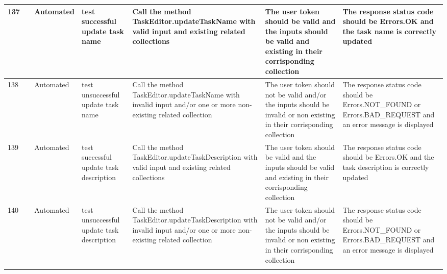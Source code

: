 \documentclass{article}
\begin{document}
{\begin{tabular}{|
    >{\columncolor[HTML]{FFFFFF}}l |
    >{\columncolor[HTML]{FFFFFF}}c |
    >{\columncolor[HTML]{FFFFFF}}l |l|l|l|l|}
    137                                 & \cellcolor[HTML]{FFFFFF}                                    & {\color[HTML]{11734B} Automated} & test successful update task name                    & Call the method TaskEditor.updateTaskName with valid input and existing related collections                                & The user token should be valid and the inputs should be valid and existing in their corrisponding collection                                             & The response status code should be Errors.OK and the task name is correctly updated                           \\ \cline{1-1} \cline{3-7} 
    138                                 & \cellcolor[HTML]{FFFFFF}                                    & {\color[HTML]{11734B} Automated} & test unsuccessful update task name                  & Call the method TaskEditor.updateTaskName with invalid input and/or one or more non-existing related collection            & The user token should not be valid and/or the inputs should be invalid or non existing in their corrisponding collection                                 & The response status code should be Errors.NOT\_FOUND or Errors.BAD\_REQUEST and an error message is displayed \\ \cline{1-1} \cline{3-7} 
    139                                 & \cellcolor[HTML]{FFFFFF}                                    & {\color[HTML]{11734B} Automated} & test successful update task description             & Call the method TaskEditor.updateTaskDescription with valid input and existing related collections                         & The user token should be valid and the inputs should be valid and existing in their corrisponding collection                                             & The response status code should be Errors.OK and the task description is correctly updated                    \\ \cline{1-1} \cline{3-7} 
    140                                 & \cellcolor[HTML]{FFFFFF}                                    & {\color[HTML]{11734B} Automated} & test unsuccessful update task description           & Call the method TaskEditor.updateTaskDescription with invalid input and/or one or more non-existing related collection     & The user token should not be valid and/or the inputs should be invalid or non existing in their corrisponding collection                                 & The response status code should be Errors.NOT\_FOUND or Errors.BAD\_REQUEST and an error message is displayed \\ \cline{1-1} \cline{3-7} 

\end{tabular}}
\end{document}
